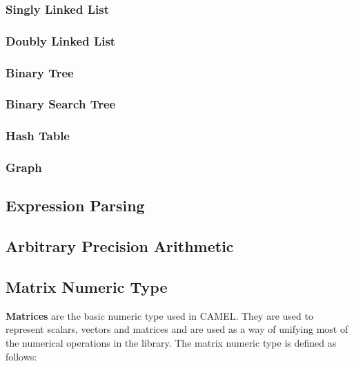 \documentclass[a4paper,oneside,8pt]{extarticle}
\theoremstyle{definition}
\begin{document}
\subsubsection{Singly Linked List}

\subsubsection{Doubly Linked List}

\subsubsection{Binary Tree}

\subsubsection{Binary Search Tree}

\subsubsection{Hash Table}

\subsubsection{Graph}

\subsection{Expression Parsing}

\subsection{Arbitrary Precision Arithmetic}

\subsection{Matrix Numeric Type}

\textbf{Matrices} are the basic numeric type used in CAMEL. They are used to represent scalars, vectors and matrices and are used as a way of unifying most of the numerical operations in the library. The matrix numeric type is defined as follows: \newline
\end{document}
